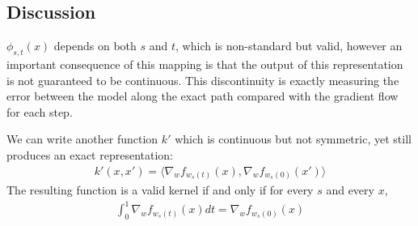 
\subsection{Discussion}


$\phi_{s,t}(x)$ depends on both $s$ and $t$, which is non-standard but valid, however an important consequence of this mapping is that the output of this representation is not guaranteed to be continuous. This discontinuity is exactly measuring the error between the model along the exact path compared with the gradient flow for each step. 

We can write another function $k'$ which is continuous but not symmetric, yet still produces an exact representation:
\begin{align}
k'(x, x') = \langle \nabla_w f_{w_s(t)}(x), \nabla_w f_{w_s(0)}(x')\rangle
\end{align}
The resulting function is a valid kernel if and only if for every $s$ and every $x$, 
\begin{align}
\label{eq:cond}
    \int_0^1 \nabla_w f_{w_s(t)}(x)dt = \nabla_w f_{w_s(0)}(x)
\end{align}

